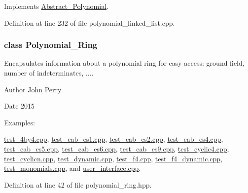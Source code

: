 Implements \hyperlink{group__polygroup_a12e023570eb675343c4b7ed635a031dc}{Abstract\+\_\+\+Polynomial}.



Definition at line 232 of file polynomial\+\_\+linked\+\_\+list.\+cpp.

\label{class_polynomial___ring}
\subsubsection{class Polynomial\+\_\+\+Ring}
Encapsulates information about a polynomial ring for easy access\+: ground field, number of indeterminates, {$\dots$}. 

\begin{DoxyAuthor}{Author}
John Perry 
\end{DoxyAuthor}
\begin{DoxyDate}{Date}
2015 
\end{DoxyDate}
\begin{Desc}
\item[Examples\+: ]\par
\hyperlink{test_4by4_8cpp-example}{test\+\_\+4by4.\+cpp}, \hyperlink{test_cab_es1_8cpp-example}{test\+\_\+cab\+\_\+es1.\+cpp}, \hyperlink{test_cab_es2_8cpp-example}{test\+\_\+cab\+\_\+es2.\+cpp}, \hyperlink{test_cab_es4_8cpp-example}{test\+\_\+cab\+\_\+es4.\+cpp}, \hyperlink{test_cab_es5_8cpp-example}{test\+\_\+cab\+\_\+es5.\+cpp}, \hyperlink{test_cab_es6_8cpp-example}{test\+\_\+cab\+\_\+es6.\+cpp}, \hyperlink{test_cab_es9_8cpp-example}{test\+\_\+cab\+\_\+es9.\+cpp}, \hyperlink{test_cyclic4_8cpp-example}{test\+\_\+cyclic4.\+cpp}, \hyperlink{test_cyclicn_8cpp-example}{test\+\_\+cyclicn.\+cpp}, \hyperlink{test_dynamic_8cpp-example}{test\+\_\+dynamic.\+cpp}, \hyperlink{test_f4_8cpp-example}{test\+\_\+f4.\+cpp}, \hyperlink{test_f4_dynamic_8cpp-example}{test\+\_\+f4\+\_\+dynamic.\+cpp}, \hyperlink{test_monomials_8cpp-example}{test\+\_\+monomials.\+cpp}, and \hyperlink{user_interface_8cpp-example}{user\+\_\+interface.\+cpp}.\end{Desc}


Definition at line 42 of file polynomial\+\_\+ring.\+hpp.

